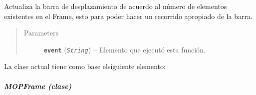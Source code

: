 \documentclass[letterpaper,10pt,english]{sphinxmanual}
\begin{document}
\begin{fulllineitems}
\begin{fulllineitems}
Actualiza la barra de desplazamiento de acuerdo al número de elementos
existentes en el Frame, esto para poder hacer un recorrido apropiado de 
la barra.
\begin{quote}\begin{description}
\item[{Parameters}] \leavevmode
\textbf{\texttt{event}} (\emph{\texttt{String}}) -- Elemento que ejecutó esta función.

\end{description}\end{quote}

\end{fulllineitems}


\end{fulllineitems}


La clase actual tiene como base elsiguiente elemento:


\subparagraph{MOPFrame (clase)}
\label{View/Additional/MenuInternalOption/InternalOptionTab/MOPFrame:mopframe-clase}\label{View/Additional/MenuInternalOption/InternalOptionTab/MOPFrame:module-View.Additional.MenuInternalOption.InternalOptionTab.MOPFrame}\label{View/Additional/MenuInternalOption/InternalOptionTab/MOPFrame::doc}
\end{document}

